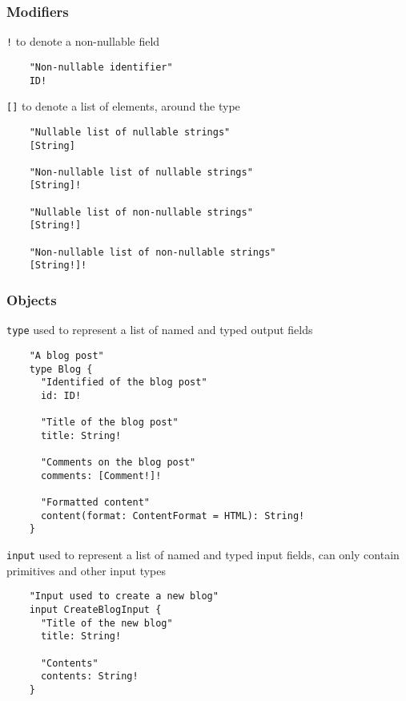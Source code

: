 \documentclass[notes]{beamer}
\begin{document}
\begin{frame}[fragile]
  \frametitle{Modifiers}
  \texttt{!} to denote a non-nullable field
  \begin{verbatim}
    "Non-nullable identifier"
    ID!
  \end{verbatim}

  \texttt{[]} to denote a list of elements, around the type
  \begin{verbatim}
    "Nullable list of nullable strings"
    [String]

    "Non-nullable list of nullable strings"
    [String]!

    "Nullable list of non-nullable strings"
    [String!]

    "Non-nullable list of non-nullable strings"
    [String!]!
  \end{verbatim}
\end{frame}


\begin{frame}[fragile]
  \frametitle{Objects}
  \texttt{type} used to represent a list of named and typed output fields
  \begin{verbatim}
    "A blog post"
    type Blog {
      "Identified of the blog post"
      id: ID!

      "Title of the blog post"
      title: String!

      "Comments on the blog post"
      comments: [Comment!]!

      "Formatted content"
      content(format: ContentFormat = HTML): String!
    }
  \end{verbatim}

  \texttt{input} used to represent a list of named and typed input fields, can only contain primitives and other input types
  \begin{verbatim}
    "Input used to create a new blog"
    input CreateBlogInput {
      "Title of the new blog"
      title: String!

      "Contents"
      contents: String!
    }
  \end{verbatim}
\end{frame}
\end{document}
